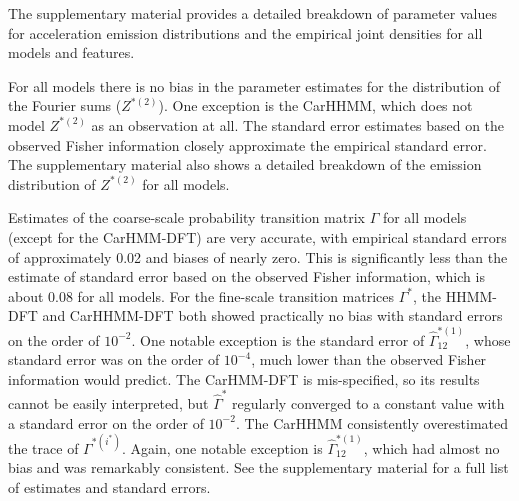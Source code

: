 The supplementary material provides a detailed breakdown of parameter values for acceleration emission distributions and the empirical joint densities for all models and features.

For all models there is no bias in the parameter estimates for the distribution of the Fourier sums ($Z^{*(2)}$). One exception is the CarHHMM, which does not model $Z^{*(2)}$ as an observation at all. The standard error estimates based on the observed Fisher information closely approximate the empirical standard error.
The supplementary material also shows a detailed breakdown of the emission distribution of $Z^{*(2)}$ for all models.

Estimates of the coarse-scale probability transition matrix $\Gamma$ for all models (except for the CarHMM-DFT) are very accurate, with empirical standard errors of approximately 0.02 and biases of nearly zero. This is significantly less than the estimate of standard error based on the observed Fisher information, which is about 0.08 for all models.
For the fine-scale transition matrices $\Gamma^*$, the HHMM-DFT and CarHHMM-DFT both showed practically no bias with standard errors on the order of $10^{-2}$. One notable exception is the standard error of $\hat \Gamma^{*(1)}_{12}$, whose standard error was on the order of $10^{-4}$, much lower than the observed Fisher information would predict. The CarHMM-DFT is mis-specified, so its results cannot be easily interpreted, but $\hat \Gamma^*$ regularly converged to a constant value with a standard error on the order of $10^{-2}$. The CarHHMM consistently overestimated the trace of $\Gamma^{*(i^*)}$. Again, one notable exception is $\hat \Gamma^{*(1)}_{12}$, which had almost no bias and was remarkably consistent. See the supplementary material for a full list of estimates and standard errors.

\fi